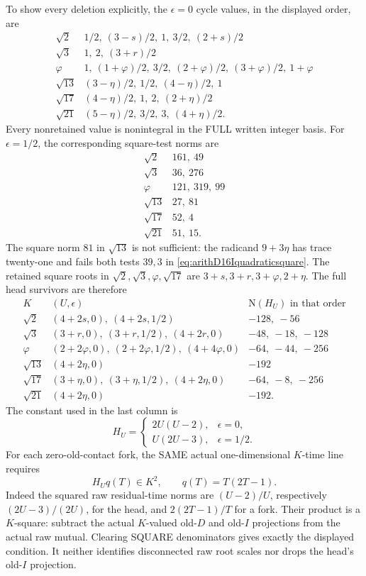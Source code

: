 \documentclass[11pt]{article}
\begin{document}
To show every deletion explicitly,
the \(\epsilon=0\) cycle values,
in the displayed order, are
\[
\begin{array}{c|l}
 \sqrt2&1/2,\ (3-s)/2,\ 1,\ 3/2,\ (2+s)/2\\
 \sqrt3&1,\ 2,\ (3+r)/2\\
 \varphi&1,\ (1+\varphi)/2,\ 3/2,\ (2+\varphi)/2,\
                       (3+\varphi)/2,\ 1+\varphi\\
 \sqrt{13}&(3-\eta)/2,\ 1/2,\ (4-\eta)/2,\ 1\\
 \sqrt{17}&(4-\eta)/2,\ 1,\ 2,\ (2+\eta)/2\\
 \sqrt{21}&(5-\eta)/2,\ 3/2,\ 3,\ (4+\eta)/2 .
\end{array}
\]
Every nonretained value is
nonintegral in the FULL written
integer basis.
For \(\epsilon=1/2\), the corresponding
square-test norms are
\[
\begin{array}{c|l}
 \sqrt2&161,\ 49\\
 \sqrt3&36,\ 276\\
 \varphi&121,\ 319,\ 99\\
 \sqrt{13}&27,\ 81\\
 \sqrt{17}&52,\ 4\\
 \sqrt{21}&51,\ 15 .
\end{array}
\]
The square norm \(81\) in
\(\sqrt{13}\) is not sufficient:
the radicand \(9+3\eta\) has trace
twenty-one and fails both tests
\(39,3\) in
\eqref{eq:arithD16Iquadraticsquare}.
The retained square roots in
\(\sqrt2,\sqrt3,\varphi,\sqrt{17}\)
are \(3+s,3+r,3+\varphi,2+\eta\).
The full head survivors are therefore
\[
\begin{array}{c|l|l}
 K&(U,\epsilon)&\mathrm N(H_U)\text{ in that order}\\ \hline
 \sqrt2&(4+2s,0),\ (4+2s,1/2)&-128,\ -56\\
 \sqrt3&(3+r,0),\ (3+r,1/2),\ (4+2r,0)&-48,\ -18,\ -128\\
 \varphi&(2+2\varphi,0),\ (2+2\varphi,1/2),\
             (4+4\varphi,0)&-64,\ -44,\ -256\\
 \sqrt{13}&(4+2\eta,0)&-192\\
 \sqrt{17}&(3+\eta,0),\ (3+\eta,1/2),\
             (4+2\eta,0)&-64,\ -8,\ -256\\
 \sqrt{21}&(4+2\eta,0)&-192 .
\end{array}
\]
The constant used in the last
column is
\[
 H_U=
 \begin{cases}
  2U(U-2),&\epsilon=0,\\
  U(2U-3),&\epsilon=1/2 .
 \end{cases}
\]
For each zero-old-contact fork,
the SAME actual one-dimensional
\(K\)-time line requires
\[
                              H_Uq(T)\in K^2,\qquad q(T)=T(2T-1).
\tag{D16IQheadfork}\label{eq:arithD16Iquadraticheadfork}
\]
Indeed the squared raw residual-time
norms are \((U-2)/U\), respectively
\((2U-3)/(2U)\), for the head,
and \(2(2T-1)/T\) for a fork.
Their product is a \(K\)-square:
subtract the actual \(K\)-valued
old-\(D\) and old-\(I\) projections
from the actual raw mutual.
Clearing SQUARE denominators gives
exactly the displayed condition.
It neither identifies disconnected
raw root scales nor drops the head's
old-\(I\) projection.
\end{document}
